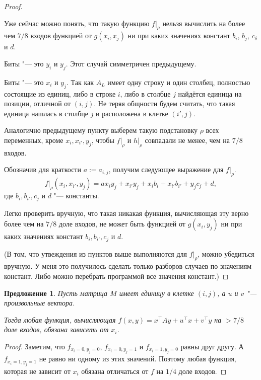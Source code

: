 \documentclass[oneside, a4paper]{article}
\newtheorem{proposition}{Предложение}
\theoremstyle{definition}
\theoremstyle{remark}
\begin{document}
\begin{proof}
\begin{description}
Уже сейчас можно понять, что такую функцию $f \rvert _ \rho$ нельзя вычислить на
более чем $7/8$ входов функцией от $g(x_i, x_j)$ ни при каких значениях констант
$b_i$, $b_j$, $c_\delta$ и $d$.


\item{Биты "--- это $y_i$ и $y_j$.} Этот случай симметричен предыдущему.
\item{Биты "--- это $x_i$ и $y_j$.} Так как $A_L$ имеет одну строку и один
столбец, полностью состоящие из единиц, либо в строке $i$, либо в столбце $j$
найдётся единица на позиции, отличной от $(i, j)$. Не теряя общности будем
считать, что такая единица нашлась в столбце $j$ и расположена в клетке $(i',
j)$.

Аналогично предыдущему пункту выберем такую подстановку $\rho$ всех переменных,
кроме $x_i, x_{i'}, y_j$, чтобы $f \rvert _ \rho$ и $h \rvert _ \rho$ совпадали
не менее, чем на $7/8$ входов.

Обозначив для краткости $a := a_{i, j}$, получим следующее выражение для $f
\rvert _ \rho$.
\[
f \rvert _ \rho (x_i, x_{i'}, y_j) = a x_i y_j + x_{i'} y_j + x_i b_i + x_{i'} b_{i'} + y_j c_j + d,
\]
где $b_{i}, b_{i'}, c_j$ и $d$ "--- константы.

Легко проверить вручную, что такая никакая функция, вычисляющая эту верно более
чем на $7/8$ доле входов, не может быть функцией от $g(x_i, y_j)$ ни при каких
значениях констант $b_{i}, b_{i'}, c_j$ и $d$.
\end{description}

(В том, что утвеждения из пунктов выше выполняются для $f \rvert _ \rho$, можно
убедиться вручную. У меня это получилось сделать только разборов случаев по
значениям констант. Либо можно перебрать программой все значения констант.)
\end{proof}

\begin{proposition} \label{single_one}
Пусть матрица $M$ имеет единицу в клетке $(i, j)$, а $u$ и $v$ "--- произвольные
вектора.

Тогда любая функция, вычисляющая $f(x, y) = x^\top A y + u^\top x + v^\top y$ на
$> 7/8$ доле входов, обязана зависеть от $x_i$.
\end{proposition}
\begin{proof}
Заметим, что $f_{x_i = 0, y_j = 0}$, $f_{x_i = 0, y_j = 1}$ и $f_{x_i = 1, y_j =
0}$ равны друг другу. А $f_{x_i = 1, y_j = 1}$ не равно ни одному из этих значений.
Поэтому любая функция, которая не зависит от $x_i$ обязана отличаться от $f$ на
$1/4$ доле входов.
\end{proof}
\end{document}
